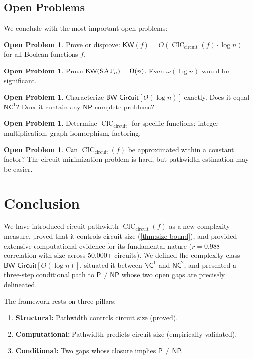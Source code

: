 \documentclass[11pt]{article}
\theoremstyle{plain}
\theoremstyle{definition}
\newtheorem{openproblem}[theorem]{Open Problem}
\newcommand{\CIC}{\operatorname{CIC}}
\newcommand{\CICcirc}{\CIC_{\text{circuit}}}
\newcommand{\SAT}{\textsc{SAT}}
\newcommand{\KW}{\mathsf{KW}}
\newcommand{\Pclass}{\mathsf{P}}
\newcommand{\NP}{\mathsf{NP}}
\newcommand{\NC}{\mathsf{NC}}
\newcommand{\BWCircuit}{\mathsf{BW\text{-}Circuit}}
\begin{document}
\subsection{Open Problems}

We conclude with the most important open problems:

\begin{openproblem}\label{open:gap1}
Prove or disprove: $\KW(f) = O(\CICcirc(f) \cdot \log n)$ for all Boolean functions $f$.
\end{openproblem}

\begin{openproblem}\label{open:gap2}
Prove $\KW(\SAT_n) = \Omega(n)$. Even $\omega(\log n)$ would be significant.
\end{openproblem}

\begin{openproblem}\label{open:bw}
Characterize $\BWCircuit[O(\log n)]$ exactly. Does it equal $\NC^1$? Does it contain any $\NP$-complete problems?
\end{openproblem}

\begin{openproblem}\label{open:specific}
Determine $\CICcirc$ for specific functions: integer multiplication, graph isomorphism, factoring.
\end{openproblem}

\begin{openproblem}\label{open:approx}
Can $\CICcirc(f)$ be approximated within a constant factor? The circuit minimization problem is hard, but pathwidth estimation may be easier.
\end{openproblem}


\section{Conclusion}\label{sec:conclusion}

We have introduced circuit pathwidth $\CICcirc(f)$ as a new complexity measure, proved that it controls circuit size (\cref{thm:size-bound}), and provided extensive computational evidence for its fundamental nature ($r = 0.988$ correlation with size across 50{,}000+ circuits). We defined the complexity class $\BWCircuit[O(\log n)]$, situated it between $\NC^1$ and $\NC^2$, and presented a three-step conditional path to $\Pclass \neq \NP$ whose two open gaps are precisely delineated.

The framework rests on three pillars:
\begin{enumerate}
    \item \textbf{Structural:} Pathwidth controls circuit size (proved).
    \item \textbf{Computational:} Pathwidth predicts circuit size (empirically validated).
    \item \textbf{Conditional:} Two gaps whose closure implies $\Pclass \neq \NP$.
\end{enumerate}
\end{document}
